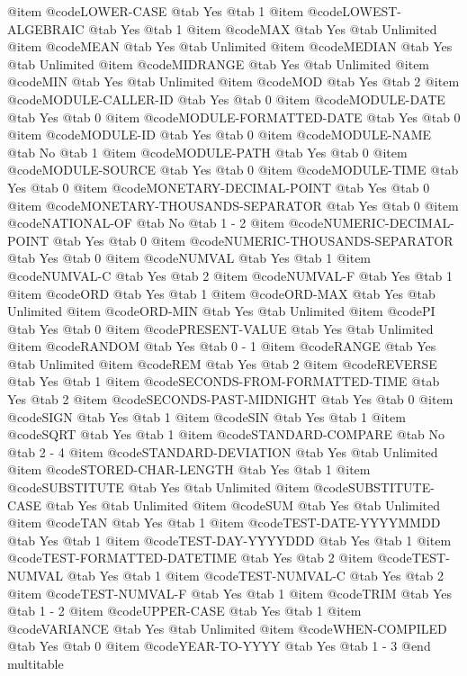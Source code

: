 @item @code{LOWER-CASE} @tab Yes @tab 1
@item @code{LOWEST-ALGEBRAIC} @tab Yes @tab 1
@item @code{MAX} @tab Yes @tab Unlimited
@item @code{MEAN} @tab Yes @tab Unlimited
@item @code{MEDIAN} @tab Yes @tab Unlimited
@item @code{MIDRANGE} @tab Yes @tab Unlimited
@item @code{MIN} @tab Yes @tab Unlimited
@item @code{MOD} @tab Yes @tab 2
@item @code{MODULE-CALLER-ID} @tab Yes @tab 0
@item @code{MODULE-DATE} @tab Yes @tab 0
@item @code{MODULE-FORMATTED-DATE} @tab Yes @tab 0
@item @code{MODULE-ID} @tab Yes @tab 0
@item @code{MODULE-NAME} @tab No @tab 1
@item @code{MODULE-PATH} @tab Yes @tab 0
@item @code{MODULE-SOURCE} @tab Yes @tab 0
@item @code{MODULE-TIME} @tab Yes @tab 0
@item @code{MONETARY-DECIMAL-POINT} @tab Yes @tab 0
@item @code{MONETARY-THOUSANDS-SEPARATOR} @tab Yes @tab 0
@item @code{NATIONAL-OF} @tab No @tab 1 - 2
@item @code{NUMERIC-DECIMAL-POINT} @tab Yes @tab 0
@item @code{NUMERIC-THOUSANDS-SEPARATOR} @tab Yes @tab 0
@item @code{NUMVAL} @tab Yes @tab 1
@item @code{NUMVAL-C} @tab Yes @tab 2
@item @code{NUMVAL-F} @tab Yes @tab 1
@item @code{ORD} @tab Yes @tab 1
@item @code{ORD-MAX} @tab Yes @tab Unlimited
@item @code{ORD-MIN} @tab Yes @tab Unlimited
@item @code{PI} @tab Yes @tab 0
@item @code{PRESENT-VALUE} @tab Yes @tab Unlimited
@item @code{RANDOM} @tab Yes @tab 0 - 1
@item @code{RANGE} @tab Yes @tab Unlimited
@item @code{REM} @tab Yes @tab 2
@item @code{REVERSE} @tab Yes @tab 1
@item @code{SECONDS-FROM-FORMATTED-TIME} @tab Yes @tab 2
@item @code{SECONDS-PAST-MIDNIGHT} @tab Yes @tab 0
@item @code{SIGN} @tab Yes @tab 1
@item @code{SIN} @tab Yes @tab 1
@item @code{SQRT} @tab Yes @tab 1
@item @code{STANDARD-COMPARE} @tab No @tab 2 - 4
@item @code{STANDARD-DEVIATION} @tab Yes @tab Unlimited
@item @code{STORED-CHAR-LENGTH} @tab Yes @tab 1
@item @code{SUBSTITUTE} @tab Yes @tab Unlimited
@item @code{SUBSTITUTE-CASE} @tab Yes @tab Unlimited
@item @code{SUM} @tab Yes @tab Unlimited
@item @code{TAN} @tab Yes @tab 1
@item @code{TEST-DATE-YYYYMMDD} @tab Yes @tab 1
@item @code{TEST-DAY-YYYYDDD} @tab Yes @tab 1
@item @code{TEST-FORMATTED-DATETIME} @tab Yes @tab 2
@item @code{TEST-NUMVAL} @tab Yes @tab 1
@item @code{TEST-NUMVAL-C} @tab Yes @tab 2
@item @code{TEST-NUMVAL-F} @tab Yes @tab 1
@item @code{TRIM} @tab Yes @tab 1 - 2
@item @code{UPPER-CASE} @tab Yes @tab 1
@item @code{VARIANCE} @tab Yes @tab Unlimited
@item @code{WHEN-COMPILED} @tab Yes @tab 0
@item @code{YEAR-TO-YYYY} @tab Yes @tab 1 - 3
@end multitable
